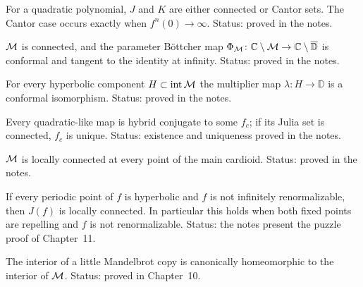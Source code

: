 \begin{theorem}
\label{thm:lyubich-4-13}
For a quadratic polynomial, $J$ and $K$ are either connected or Cantor sets.  The
Cantor case occurs exactly when $f^n(0)\to\infty$.  Status: proved in the notes.
\end{theorem}

\begin{theorem}
\label{thm:lyubich-6-10}
$\mathcal M$ is connected, and the parameter Böttcher map
$\Phi_\mathcal M\colon\mathbb C\setminus\mathcal M\to\mathbb C\setminus\overline{\mathbb D}$ is conformal and tangent to
the identity at infinity.  Status: proved in the notes.
\end{theorem}

\begin{theorem}
\label{thm:lyubich-6-12}
For every hyperbolic component $H\subset\operatorname{int}\mathcal M$ the multiplier map
$\lambda\colon H\to\mathbb D$ is a conformal isomorphism.  Status: proved in the notes.
\end{theorem}

\begin{theorem}
\label{thm:lyubich-9-2}
Every quadratic-like map is hybrid conjugate to some $f_c$; if its Julia set is
connected, $f_c$ is unique.  Status: existence and uniqueness proved in the notes.
\end{theorem}

\begin{theorem}
\label{thm:lyubich-7-36}
$\mathcal M$ is locally connected at every point of the main cardioid.  Status: proved in the notes.
\end{theorem}

\begin{theorem}
\label{thm:lyubich-11-5}
If every periodic point of $f$ is hyperbolic and $f$ is not infinitely renormalizable,
then $J(f)$ is locally connected.  In particular this holds when both fixed points are
repelling and $f$ is not renormalizable.  Status: the notes present the puzzle proof of
Chapter~11.
\end{theorem}

\begin{theorem}
\label{thm:lyubich-10-15}
The interior of a little Mandelbrot copy is canonically homeomorphic to the interior of
$\mathcal M$.  Status: proved in Chapter~10.
\end{theorem}

